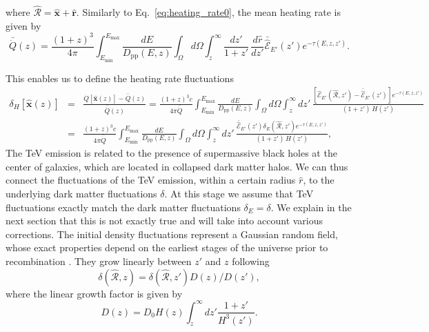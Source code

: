 \documentclass[numberedappendix]{emulateapj}
\begin{document}
where $\mathbf{\hat{\mathcal{R}}} = \mathbf{\hat{x}} + \mathbf{\hat{r}}$. Similarly to Eq.~\eqref{eq:heating_rate0}, the mean heating rate is given by
\begin{equation}
\label{eq:mean_exp_heat}
\bar{\dot{Q}} (z)=\frac{(1+z)^3}{4\pi}\int_{E_{\mathrm{min}}}^{E_{\mathrm{max}}} \frac{dE}{D_{\mathrm{pp}}(E, z)}\int_{\Omega}d\Omega\int_z^{\infty} \frac{d z'}{1+z'}\, \frac{d\hat r}{dz'}\bar{\hat{\mathcal{E}}}_{E'}(z') e^{-\tau(E,z,z')}.
\end{equation}

This enables us to define the heating rate fluctuations
\begin{eqnarray}
\label{eq:fluc_exp0}
\delta_H[\mathbf{\hat{x}}(z)]&=&\frac{\dot{Q}[\mathbf{\hat{x}}(z)]-\bar{\dot{Q}}(z)}{\bar{\dot{Q}}(z)}=\frac{(1+z)^3c}{4\pi\bar{\dot{Q}}} \int_{E_{\mathrm{min}}}^{E_{\mathrm{max}}}\frac{dE}{D_{\mathrm{pp}}(E,z)}\int_{\Omega}d\Omega\int_z^{\infty} d z'\,\frac{ \left[ \mathcal{\hat E}_{E'}(\mathbf{\hat{\mathcal{R}}}, z')-\bar{\hat{\mathcal{E}}}_{E'}(z')\right] e^{-\tau(E,z,z')}}{(1+z')\,H(z')} \nonumber\\ 
&=&\frac{(1+z)^3 c}{4\pi\bar{\dot{Q}}} \int_{E_{\mathrm{min}}}^{E_{\mathrm{max}}} \frac{dE}{D_{\mathrm{pp}}(E,z)}\int_{\Omega}d\Omega\int_z^{\infty} d z'\, \frac{\bar{\hat{\mathcal{E}}}_{E'}(z')\delta_E(\mathbf{\hat{\mathcal{R}}}, z') e^{-\tau(E,z,z')}}{(1+z')\,H(z')},
\end{eqnarray}
The TeV emission is related to the presence of supermassive black holes at the center of galaxies, which are located in collapsed dark matter halos. We can thus connect the fluctuations of the TeV emission, within a certain radius $\hat r$, to the underlying dark matter fluctuations $\delta$.
At this stage we assume that TeV fluctuations exactly match the dark matter fluctuations $\delta_E=\delta$. We explain in the next section that this is not exactly true and will take into account various corrections. The initial density fluctuations represent a Gaussian random field, whose exact properties depend on the earliest stages of the universe prior to recombination \citep{1986ApJ...304...15B,Peebles}. They grow linearly between $z'$ and $z$ following  \citep{ 1977MNRAS.179..351H}
\begin{equation}
  \label{eq:growth}
\delta(\mathbf{\hat{\mathcal{R}}}, z)=\delta(\mathbf{\hat{\mathcal{R}}}, z')D(z)/D(z'),
\end{equation}
where the linear growth factor is given by
\begin{equation}
\label{eq:growth_1}
D(z)=D_0H(z)\int_z^{\infty}dz'\frac{1+z'}{H^3(z')}.
\end{equation}
\end{document}
